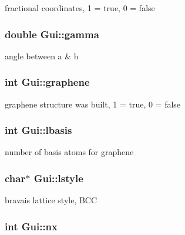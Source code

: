fractional coordinates, 1 = true, 0 = false 

\hypertarget{class_gui_abe1f84fa6c83a5b3b0d939e6be73d3b5}{}
\subsubsection[{gamma}]{\setlength{\rightskip}{0pt plus 5cm}double Gui\+::gamma}\label{class_gui_abe1f84fa6c83a5b3b0d939e6be73d3b5}


angle between a \& b 

\hypertarget{class_gui_ae0e6f586344389900c55dc4eaa5206db}{}
\subsubsection[{graphene}]{\setlength{\rightskip}{0pt plus 5cm}int Gui\+::graphene}\label{class_gui_ae0e6f586344389900c55dc4eaa5206db}


graphene structure was built, 1 = true, 0 = false 

\hypertarget{class_gui_a8c9eebe2e978c4d0bc1bef77905c7738}{}
\subsubsection[{lbasis}]{\setlength{\rightskip}{0pt plus 5cm}int Gui\+::lbasis}\label{class_gui_a8c9eebe2e978c4d0bc1bef77905c7738}


number of basis atoms for graphene 

\hypertarget{class_gui_a39bb625a90cea3d763c46bb68e87ab11}{}
\subsubsection[{lstyle}]{\setlength{\rightskip}{0pt plus 5cm}char$\ast$ Gui\+::lstyle}\label{class_gui_a39bb625a90cea3d763c46bb68e87ab11}


bravais lattice style, B\+C\+C 

\hypertarget{class_gui_a6cb804a1531c51117e44674f83a3fbed}{}
\subsubsection[{nx}]{\setlength{\rightskip}{0pt plus 5cm}int Gui\+::nx}\label{class_gui_a6cb804a1531c51117e44674f83a3fbed}


